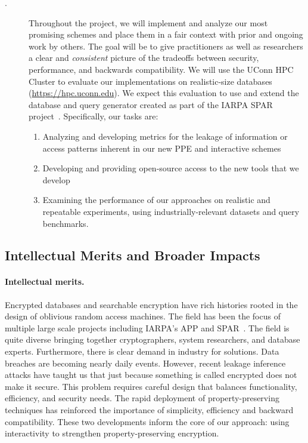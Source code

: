 \begin{description}
\item[.] Throughout the project, we will implement
and analyze our most promising schemes and place them in a fair context
with prior and ongoing work by others. The goal will be to give
practitioners as well as researchers a clear and \emph{consistent}
picture of the tradeoffs between security, performance, and backwards
compatibility.
We will use the UConn HPC Cluster to evaluate our
implementations on realistic-size databases (\url{https://hpc.uconn.edu}).
We expect this evaluation
to use and extend the database and query generator created as part of
the IARPA SPAR project~\cite{varia2015automated}. Specifically, our
tasks are:
\begin{enumerate}
\setlength\itemsep{0em}
\item Analyzing and developing metrics for the leakage of
information or access patterns inherent in our new PPE and interactive
schemes
\item Developing and providing open-source access to the new tools that
we develop
\item Examining the performance of our approaches on realistic and
repeatable experiments, using industrially-relevant datasets and query
benchmarks.
\end{enumerate}
\end{description}

\subsection{Intellectual Merits and Broader Impacts}
\paragraph{Intellectual merits.}  
Encrypted databases and searchable encryption have rich histories rooted in the
design of oblivious random access machines.  The field has been the focus of multiple large scale projects including IARPA's APP and SPAR~\cite{spar_baa}.  The field is quite diverse bringing together cryptographers, system researchers, and database experts.  Furthermore, there is clear demand in industry for solutions.  Data breaches are becoming nearly daily events.  However, recent
leakage inference attacks have taught us that just because something is called encrypted does not make it secure.  This problem requires careful design that balances functionality, efficiency, and security needs.  The rapid deployment of property-preserving
techniques has reinforced the importance of simplicity, efficiency and backward
compatibility.  These two developments inform the core of our approach: using
interactivity to strengthen property-preserving encryption.

